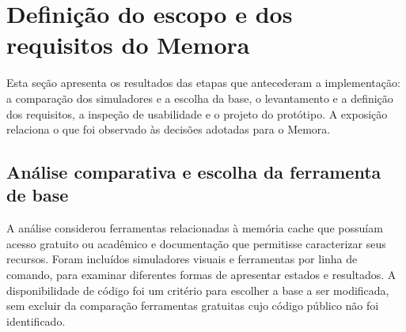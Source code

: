 \section{Definição do escopo e dos requisitos do Memora}
\label{sec:desenvolvimento}

Esta seção apresenta os resultados das etapas que antecederam a implementação: a comparação dos simuladores e a escolha da base, o levantamento e a definição dos requisitos, a inspeção de usabilidade e o projeto do protótipo. A exposição relaciona o que foi observado às decisões adotadas para o Memora.

\subsection{Análise comparativa e escolha da ferramenta de base}

A análise considerou ferramentas relacionadas à memória cache que possuíam acesso gratuito ou acadêmico e documentação que permitisse caracterizar seus recursos. Foram incluídos simuladores visuais e ferramentas por linha de comando, para examinar diferentes formas de apresentar estados e resultados. A disponibilidade de código foi um critério para escolher a base a ser modificada, sem excluir da comparação ferramentas gratuitas cujo código público não foi identificado.

